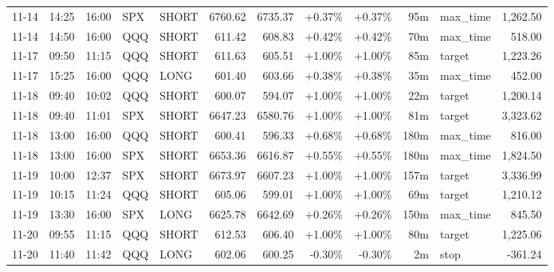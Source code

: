 \documentclass[11pt,a4paper]{article}
\begin{document}
\begin{center}
\begin{longtable}{>{\color{txtmain}}l l l l l r r r r r >{\color{txtmain}}l r}
11-14 & 14:25 & 16:00 & SPX & SHORT & 6760.62 & 6735.37 & \textcolor{wingreen}{+0.37\%} & \textcolor{wingreen}{+0.37\%} & 95m & max\_time & \textcolor{wingreen}{1,262.50} \\
11-14 & 14:50 & 16:00 & QQQ & SHORT & 611.42 & 608.83 & \textcolor{wingreen}{+0.42\%} & \textcolor{wingreen}{+0.42\%} & 70m & max\_time & \textcolor{wingreen}{518.00} \\
11-17 & 09:50 & 11:15 & QQQ & SHORT & 611.63 & 605.51 & \textcolor{wingreen}{+1.00\%} & \textcolor{wingreen}{+1.00\%} & 85m & target & \textcolor{wingreen}{1,223.26} \\
11-17 & 15:25 & 16:00 & QQQ & LONG & 601.40 & 603.66 & \textcolor{wingreen}{+0.38\%} & \textcolor{wingreen}{+0.38\%} & 35m & max\_time & \textcolor{wingreen}{452.00} \\
11-18 & 09:40 & 10:02 & QQQ & SHORT & 600.07 & 594.07 & \textcolor{wingreen}{+1.00\%} & \textcolor{wingreen}{+1.00\%} & 22m & target & \textcolor{wingreen}{1,200.14} \\
11-18 & 09:40 & 11:01 & SPX & SHORT & 6647.23 & 6580.76 & \textcolor{wingreen}{+1.00\%} & \textcolor{wingreen}{+1.00\%} & 81m & target & \textcolor{wingreen}{3,323.62} \\
11-18 & 13:00 & 16:00 & QQQ & SHORT & 600.41 & 596.33 & \textcolor{wingreen}{+0.68\%} & \textcolor{wingreen}{+0.68\%} & 180m & max\_time & \textcolor{wingreen}{816.00} \\
11-18 & 13:00 & 16:00 & SPX & SHORT & 6653.36 & 6616.87 & \textcolor{wingreen}{+0.55\%} & \textcolor{wingreen}{+0.55\%} & 180m & max\_time & \textcolor{wingreen}{1,824.50} \\
11-19 & 10:00 & 12:37 & SPX & SHORT & 6673.97 & 6607.23 & \textcolor{wingreen}{+1.00\%} & \textcolor{wingreen}{+1.00\%} & 157m & target & \textcolor{wingreen}{3,336.99} \\
11-19 & 10:15 & 11:24 & QQQ & SHORT & 605.06 & 599.01 & \textcolor{wingreen}{+1.00\%} & \textcolor{wingreen}{+1.00\%} & 69m & target & \textcolor{wingreen}{1,210.12} \\
11-19 & 13:30 & 16:00 & SPX & LONG & 6625.78 & 6642.69 & \textcolor{wingreen}{+0.26\%} & \textcolor{wingreen}{+0.26\%} & 150m & max\_time & \textcolor{wingreen}{845.50} \\
11-20 & 09:55 & 11:15 & QQQ & SHORT & 612.53 & 606.40 & \textcolor{wingreen}{+1.00\%} & \textcolor{wingreen}{+1.00\%} & 80m & target & \textcolor{wingreen}{1,225.06} \\
11-20 & 11:40 & 11:42 & QQQ & LONG & 602.06 & 600.25 & \textcolor{lossred}{-0.30\%} & \textcolor{lossred}{-0.30\%} & 2m & stop & \textcolor{lossred}{-361.24} \\

\end{longtable}
\end{center}
\end{document}

